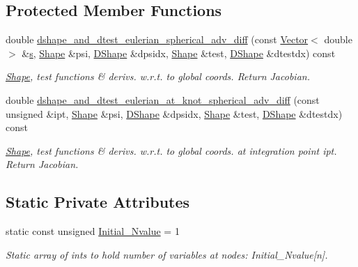\subsection*{Protected Member Functions}
\begin{DoxyCompactItemize}
\item 
double \hyperlink{classoomph_1_1QSphericalAdvectionDiffusionElement_a75d5e8f33411030e31e82da809d946d2}{dshape\+\_\+and\+\_\+dtest\+\_\+eulerian\+\_\+spherical\+\_\+adv\+\_\+diff} (const \hyperlink{classoomph_1_1Vector}{Vector}$<$ double $>$ \&\hyperlink{cfortran_8h_ab7123126e4885ef647dd9c6e3807a21c}{s}, \hyperlink{classoomph_1_1Shape}{Shape} \&psi, \hyperlink{classoomph_1_1DShape}{D\+Shape} \&dpsidx, \hyperlink{classoomph_1_1Shape}{Shape} \&test, \hyperlink{classoomph_1_1DShape}{D\+Shape} \&dtestdx) const
\begin{DoxyCompactList}\small\item\em \hyperlink{classoomph_1_1Shape}{Shape}, test functions \& derivs. w.\+r.\+t. to global coords. Return Jacobian. \end{DoxyCompactList}\item 
double \hyperlink{classoomph_1_1QSphericalAdvectionDiffusionElement_ac15987174b58e77489aa6e5f12b9db81}{dshape\+\_\+and\+\_\+dtest\+\_\+eulerian\+\_\+at\+\_\+knot\+\_\+spherical\+\_\+adv\+\_\+diff} (const unsigned \&ipt, \hyperlink{classoomph_1_1Shape}{Shape} \&psi, \hyperlink{classoomph_1_1DShape}{D\+Shape} \&dpsidx, \hyperlink{classoomph_1_1Shape}{Shape} \&test, \hyperlink{classoomph_1_1DShape}{D\+Shape} \&dtestdx) const
\begin{DoxyCompactList}\small\item\em \hyperlink{classoomph_1_1Shape}{Shape}, test functions \& derivs. w.\+r.\+t. to global coords. at integration point ipt. Return Jacobian. \end{DoxyCompactList}\end{DoxyCompactItemize}
\subsection*{Static Private Attributes}
\begin{DoxyCompactItemize}
\item 
static const unsigned \hyperlink{classoomph_1_1QSphericalAdvectionDiffusionElement_a8d490ed0cc7142335000801a905ed852}{Initial\+\_\+\+Nvalue} = 1
\begin{DoxyCompactList}\small\item\em Static array of ints to hold number of variables at nodes\+: Initial\+\_\+\+Nvalue\mbox{[}n\mbox{]}. \end{DoxyCompactList}\end{DoxyCompactItemize}
